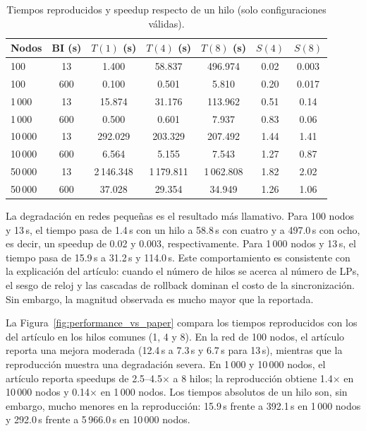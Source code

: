 \documentclass[11pt,a4paper,oneside]{article}
\begin{document}
\begin{table}[H]
\caption{Tiempos reproducidos y speedup respecto de un hilo (solo configuraciones válidas).}
\label{tab:performance}
\centering
\footnotesize
\setlength{\tabcolsep}{4pt}
\renewcommand{\arraystretch}{1.12}
\begin{tabular}{lcccccc}
\toprule
\rowcolor{tablehead}
\textbf{Nodos} & \textbf{BI (s)} &
\textbf{$T(1)$ (s)} & \textbf{$T(4)$ (s)} & \textbf{$T(8)$ (s)} &
\textbf{$S(4)$} & \textbf{$S(8)$} \\
\midrule
100     & 13  & 1.400    & 58.837   & 496.974  & 0.02 & 0.003 \\
100     & 600 & 0.100    & 0.501    & 5.810    & 0.20 & 0.017 \\
1\,000  & 13  & 15.874   & 31.176   & 113.962  & 0.51 & 0.14 \\
1\,000  & 600 & 0.500    & 0.601    & 7.937    & 0.83 & 0.06 \\
10\,000 & 13  & 292.029  & 203.329  & 207.492  & 1.44 & 1.41 \\
10\,000 & 600 & 6.564    & 5.155    & 7.543    & 1.27 & 0.87 \\
50\,000 & 13  & 2\,146.348 & 1\,179.811 & 1\,062.808 & 1.82 & 2.02 \\
50\,000 & 600 & 37.028   & 29.354   & 34.949   & 1.26 & 1.06 \\
\bottomrule
\end{tabular}
\end{table}

La degradación en redes pequeñas es el resultado más llamativo. Para 100 nodos y 13\,s, el tiempo pasa de 1.4\,s con un hilo a 58.8\,s con cuatro y a 497.0\,s con ocho, es decir, un speedup de 0.02 y 0.003, respectivamente. Para 1\,000 nodos y 13\,s, el tiempo pasa de 15.9\,s a 31.2\,s y 114.0\,s. Este comportamiento es consistente con la explicación del artículo: cuando el número de hilos se acerca al número de LPs, el sesgo de reloj y las cascadas de rollback dominan el costo de la sincronización. Sin embargo, la magnitud observada es mucho mayor que la reportada.

La Figura~\ref{fig:performance_vs_paper} compara los tiempos reproducidos con los del artículo en los hilos comunes (1, 4 y 8). En la red de 100 nodos, el artículo reporta una mejora moderada (12.4\,s a 7.3\,s y 6.7\,s para 13\,s), mientras que la reproducción muestra una degradación severa. En 1\,000 y 10\,000 nodos, el artículo reporta speedups de 2.5--4.5$\times$ a 8 hilos; la reproducción obtiene 1.4$\times$ en 10\,000 nodos y 0.14$\times$ en 1\,000 nodos. Los tiempos absolutos de un hilo son, sin embargo, mucho menores en la reproducción: 15.9\,s frente a 392.1\,s en 1\,000 nodos y 292.0\,s frente a 5\,966.0\,s en 10\,000 nodos.
\end{document}
